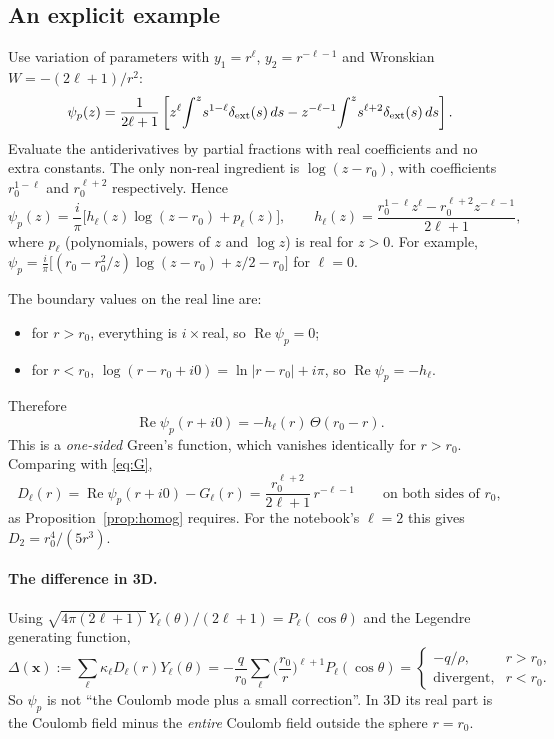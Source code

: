 \documentclass[11pt,a4paper]{article}
\renewcommand{\Re}{\operatorname{Re}}
\newcommand{\dext}{\delta_{\rm ext}}
\newcommand{\x}{\mathbf{x}}
\begin{document}
\subsection{An explicit example}
Use variation of parameters with $y_1=r^\ell$, $y_2=r^{-\ell-1}$ and Wronskian $W=-(2\ell+1)/r^2$:
\begin{equation}
\psi_p(z)=\frac{1}{2\ell+1}\left[z^\ell\!\int^z\! s^{1-\ell}\dext(s)\,ds-z^{-\ell-1}\!\int^z\! s^{\ell+2}\dext(s)\,ds\right].
\end{equation}
Evaluate the antiderivatives by partial fractions with real coefficients and no extra constants.
The only non-real ingredient is $\log(z-r_0)$, with coefficients $r_0^{1-\ell}$ and $r_0^{\ell+2}$ respectively.
Hence
\begin{equation}
\psi_p(z)=\frac{i}{\pi}\Big[h_\ell(z)\log(z-r_0)+p_\ell(z)\Big],\qquad
h_\ell(z)=\frac{r_0^{1-\ell}z^\ell-r_0^{\ell+2}z^{-\ell-1}}{2\ell+1},
\end{equation}
where $p_\ell$ (polynomials, powers of $z$ and $\log z$) is real for $z>0$.
For example, $\psi_p=\frac{i}{\pi}\big[(r_0-r_0^2/z)\log(z-r_0)+z/2-r_0\big]$ for $\ell=0$.

The boundary values on the real line are:
\begin{itemize}[nosep]
\item for $r>r_0$, everything is $i\times$real, so $\Re\psi_p=0$;
\item for $r<r_0$, $\log(r-r_0+i0)=\ln|r-r_0|+i\pi$, so $\Re\psi_p=-h_\ell$.
\end{itemize}
Therefore
\begin{equation}
\Re\psi_p(r+i0)=-h_\ell(r)\,\Theta(r_0-r).
\end{equation}
This is a \emph{one-sided} Green's function, which vanishes identically for $r>r_0$.
Comparing with \eqref{eq:G},
\begin{equation}
D_\ell(r)=\Re\psi_p(r+i0)-G_\ell(r)=\frac{r_0^{\ell+2}}{2\ell+1}\,r^{-\ell-1}\qquad\text{on both sides of }r_0,
\label{eq:Dl}
\end{equation}
as Proposition~\ref{prop:homog} requires.
For the notebook's $\ell=2$ this gives $D_2=r_0^4/(5r^3)$.

\paragraph{The difference in 3D.}
Using $\sqrt{4\pi(2\ell+1)}\,Y_\ell(\theta)/(2\ell+1)=P_\ell(\cos\theta)$ and the Legendre generating function,
\begin{equation}
\Delta(\x):=\sum_\ell\kappa_\ell D_\ell(r)Y_\ell(\theta)
=-\frac{q}{r_0}\sum_\ell\Big(\frac{r_0}{r}\Big)^{\ell+1}P_\ell(\cos\theta)
=\begin{cases}-q/\rho, & r>r_0,\\ \text{divergent}, & r<r_0.\end{cases}
\end{equation}
So $\psi_p$ is not ``the Coulomb mode plus a small correction''.
In 3D its real part is the Coulomb field minus the \emph{entire} Coulomb field outside the sphere $r=r_0$.
\end{document}
